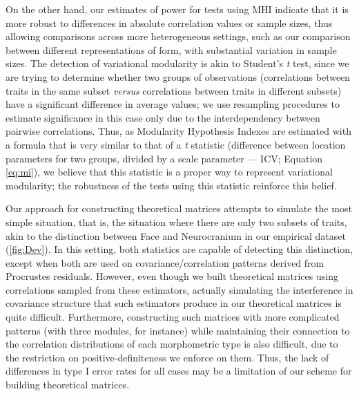 \documentclass[12pt,twoside]{report}
\begin{document}
On the other hand, our estimates of power for tests using MHI indicate
that it is more robust to differences in absolute correlation values or
sample sizes, thus allowing comparisons across more heterogeneous
settings, such as our comparison between different representations of
form, with substantial variation in sample sizes. The detection of
variational modularity is akin to Student's \emph{t} test, since we are
trying to determine whether two groups of observations (correlations
between traits in the same subset \emph{versus} correlations between
traits in different subsets) have a significant difference in average
values; we use resampling procedures to estimate significance in this
case only due to the interdependency between pairwise correlations.
Thus, as Modularity Hypothesis Indexes are estimated with a formula that
is very similar to that of a \emph{t} statistic (difference between
location parameters for two groups, divided by a scale parameter ---
ICV; Equation \ref{eq:mi}), we believe that this statistic is a proper
way to represent variational modularity; the robustness of the tests
using this statistic reinforce this belief.

Our approach for constructing theoretical matrices attempts to simulate
the most simple situation, that is, the situation where there are only
two subsets of traits, akin to the distinction between Face and
Neurocranium in our empirical dataset (\autoref{fig:Dev}). In this
setting, both statistics are capable of detecting this distinction,
except when both are used on covariance/correlation patterns derived
from Procrustes residuals. However, even though we built theoretical
matrices using correlations sampled from these estimators, actually
simulating the interference in covariance structure that such estimators
produce in our theoretical matrices is quite difficult. Furthermore,
constructing such matrices with more complicated patterns (with three
modules, for instance) while maintaining their connection to the
correlation distributions of each morphometric type is also difficult,
due to the restriction on positive-definiteness we enforce on them.
Thus, the lack of differences in type I error rates for all cases may be
a limitation of our scheme for building theoretical matrices.
\end{document}
